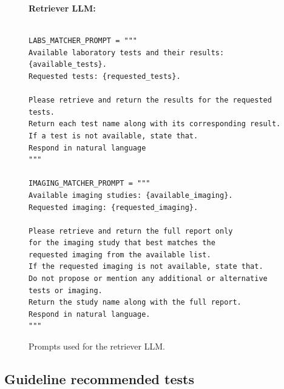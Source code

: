 \documentclass[manuscript, nonacm]{acmart}
\begin{document}
\begin{figure}[H]            %
\centering
\begin{tcolorbox}[
    colback = lightgray,
    colframe = darkgray,
    width   = \columnwidth,
    boxrule = 0.5pt,
    arc     = 3pt,
    left=6pt,right=6pt,top=6pt,bottom=6pt]
\textbf{Retriever LLM:}

\begin{Verbatim}[fontsize=\scriptsize]

LABS_MATCHER_PROMPT = """
Available laboratory tests and their results: {available_tests}.
Requested tests: {requested_tests}.

Please retrieve and return the results for the requested tests.
Return each test name along with its corresponding result.
If a test is not available, state that.
Respond in natural language
"""

IMAGING_MATCHER_PROMPT = """
Available imaging studies: {available_imaging}.
Requested imaging: {requested_imaging}.

Please retrieve and return the full report only 
for the imaging study that best matches the 
requested imaging from the available list. 
If the requested imaging is not available, state that. 
Do not propose or mention any additional or alternative tests or imaging. 
Return the study name along with the full report. 
Respond in natural language.
"""

\end{Verbatim}
\end{tcolorbox}
\caption{Prompts used for the retriever LLM.}
\end{figure}

\subsection{Guideline recommended tests}
\label{sec:rec_tests}
\end{document}
